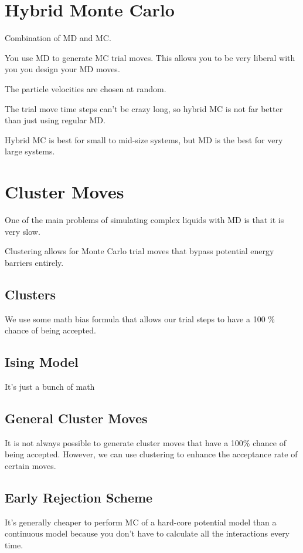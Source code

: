 \documentclass[fleqn]{report}
\begin{document}
\section{Hybrid Monte Carlo}
Combination of MD and MC. 

You use MD to generate MC trial moves. This allows you to be very liberal 
with you you design your MD moves. 

The particle velocities are chosen at random. 

The trial move time steps can't be crazy long, so hybrid MC is not far 
better than just using regular MD. 

Hybrid MC is best for small to mid-size systems, but MD is the best 
for very large systems. 

\section{Cluster Moves}
One of the main problems of simulating complex liquids with MD is that it 
is very slow. 

Clustering allows for Monte Carlo trial moves that bypass potential 
energy barriers entirely. 

\subsection{Clusters}
We use some math bias formula that allows our trial steps to have a 100 \% 
chance of being accepted. 

\subsection{Ising Model}
It's just a bunch of math 

\subsection{General Cluster Moves}
It is not always possible to generate cluster moves that have a 100\% chance 
of being accepted. However, we can use clustering to enhance the acceptance rate 
of certain moves. 

\subsection{Early Rejection Scheme}
It's generally cheaper to perform MC of a hard-core potential model than a 
continuous model because you don't have to calculate all the interactions 
every time. 
\end{document}
